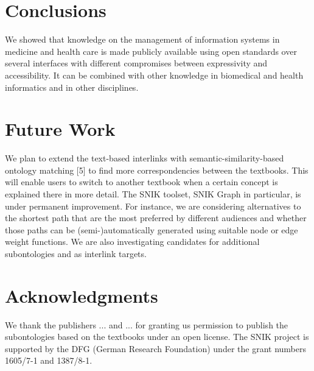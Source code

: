 \documentclass[sw]{iosart2x}
\renewcommand{\citet}{\cite}%
\begin{document}

\section{Conclusions}
We showed that knowledge on the management of information systems in medicine and health care is made publicly available using open standards over several interfaces with different compromises between expressivity and accessibility. It can be combined with other knowledge in biomedical and health informatics and in other disciplines.

\section{Future Work}
We plan to extend the text-based interlinks with semantic-similarity-based ontology matching [5] to find more correspondencies between the textbooks. This will enable users to switch to another textbook when a certain concept is explained there in more detail. The SNIK toolset, SNIK Graph in particular, is under permanent improvement. For instance, we are considering alternatives to the shortest path that are the most preferred by different audiences and whether those paths can be (semi-)automatically generated using suitable node or edge weight functions. We are also investigating candidates for additional subontologies and as interlink targets.

\section{Acknowledgments}
We thank the publishers ... and ... for granting us permission to publish the subontologies based on the textbooks \citet{bb,ob,he} under an open license.
The SNIK project is supported by the DFG (German Research Foundation) under the grant numbers 1605/7-1 and 1387/8-1.


\end{document}
